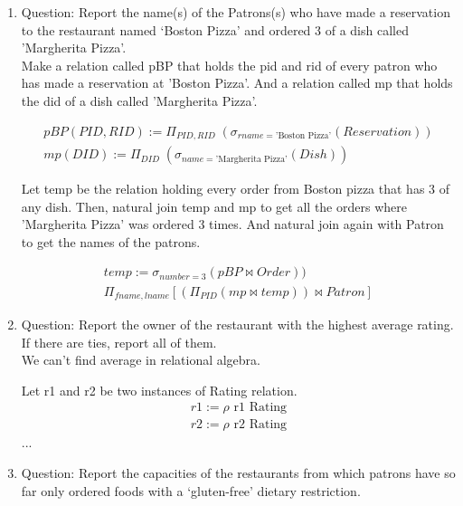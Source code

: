 \documentclass{article}
\begin{document}
\begin{enumerate}
    \item %
         Question: Report the name(s) of the Patrons(s) who have made a reservation to the restaurant
named ‘Boston Pizza’ and ordered 3 of a dish called ’Margherita Pizza’.\\

Make a relation called pBP that holds the pid and rid of every patron who has made a reservation at 'Boston Pizza'. 
And a relation called mp that holds the did of a dish called ’Margherita Pizza’.

\begin{align}
       pBP(PID,RID) := \Pi_{PID, RID}\;(\sigma_{rname = \text{'Boston Pizza'}}(Reservation))\\
        mp(DID) := \Pi_{DID}\;(\sigma_{name = \text{’Margherita Pizza’}}(Dish))
		\end{align} 
		
		Let temp be the relation holding every order from Boston pizza that has 3 of any dish. Then, natural join temp and mp to get all the orders where ’Margherita Pizza’ was ordered 3 times. And natural join again with Patron to  get the names of the patrons. 
		
\begin{align}
       temp := \sigma_{number = 3}(pBP \bowtie Order))\\
       \Pi_{fname, lname}[(\Pi_{PID} (mp \bowtie temp)) \bowtie Patron]
		\end{align} 

\item %
Question: Report the owner of the restaurant with the highest average rating. If there are ties, report all of them.\\

We can't find average in relational algebra.

Let r1 and r2 be two instances of Rating relation.
         \begin{align}
        r1:= \rho \text{  r1 Rating}  \\
        r2:= \rho \text{  r2 Rating}
		\end{align}     
		...

\item %
Question: Report the capacities of the restaurants from which patrons have so far only ordered foods with a
‘gluten-free’ dietary restriction.\\	
\end{enumerate}
\end{document}
